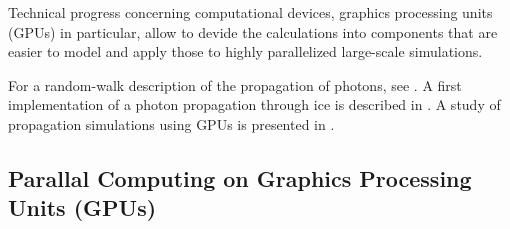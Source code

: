 Technical progress concerning computational devices, graphics processing units (GPUs) in particular, allow to devide the calculations into components that are easier to model and apply those to highly parallelized large-scale simulations.

For a random-walk description of the propagation of photons, see \cite{absorption1997}. A first implementation of a photon propagation through ice is described in \cite{lundberg}. A study of propagation simulations using GPUs is presented in \cite{ppcpaper}.


\subsection{Parallal Computing on Graphics Processing Units (GPUs)}
\label{sec:parallel_computing}


